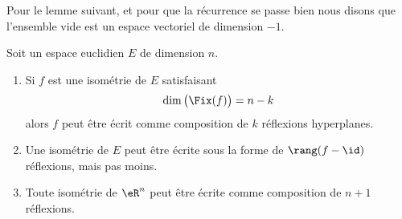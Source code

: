 Pour le lemme suivant, et pour que la récurrence se passe bien nous disons que l'ensemble vide est un espace vectoriel de dimension \( -1\).
\begin{lemma}       \label{LEMooJCDRooGAmlwp}
	Soit un espace euclidien \( E\) de dimension \( n\).
	\begin{enumerate}
		\item       \label{ITEMooFYEDooIJZBjP}
		      Si \( f\) est une isométrie de \( E\) satisfaisant
		      \begin{equation}
			      \dim\big( \Fix(f) \big)=n-k
		      \end{equation}
		      alors \( f\) peut être écrit comme composition de \( k\) réflexions hyperplanes.
		\item       \label{ITEMooJTZVooWvyfDD}
		      Une isométrie de \( E\) peut être écrite sous la forme de \( \rang(f-\id)\) réflexions, mais pas moins.
		\item       \label{ITEMooUCZWooSbyPwt}
		      Toute isométrie de \( \eR^n\) peut être écrite comme composition de \( n+1\) réflexions.
	\end{enumerate}
\end{lemma}

